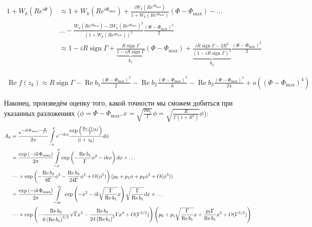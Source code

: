 \documentclass[a4paper, 12pt]{article}
\DeclareMathOperator*{\sign}{sign}
\DeclareMathOperator*{\Real}{Re}
\newenvironment{eqw}{\begin{equation} \begin{aligned}}   
    {\end{aligned}    \end{equation}}
\begin{document}
\begin{eqw}
     1+W_k(Re^{i\Phi}) &\approx 1+W_k(Re^{i\Phi_{\max}}) + 
     \frac{iW_k(Re^{i\Phi_{\max}})}{1+W_k(Re^{i\Phi_{\max}})}\left(\Phi - \Phi_{\max}\right) - \dots\\
     &\dots-\frac{W_k(Re^{i\Phi_{\max}}) - 2W_k(Re^{i\Phi_{\max}})^2}{\left(1+W_k(Re^{i\Phi_{\max}})\right)^3}\frac{\left(\Phi - \Phi_{\max}\right)^2}{2}\\
     &\approx 1- i R \sign \Gamma + \underbrace{\frac{R \sign \Gamma}{1-i R \sign \Gamma}}_{b_1}\left(\Phi - \Phi_{\max}\right) +
     \underbrace{\frac{i R \sign \Gamma - 2 R^2}{\left(1-i R \sign \Gamma\right)^3}}_{b_2}\frac{\left(\Phi - \Phi_{\max}\right)^2}{2}
\end{eqw}

\begin{eqw}
    \Real f(z_k) \approx R\sign\Gamma - \Real b_1 \frac{\left(\Phi - \Phi_{\max}\right)^2}{2} - \Real b_2 \frac{\left(\Phi - \Phi_{\max}\right)^3}{6} - \Real b_3 \frac{\left(\Phi - \Phi_{\max}\right)^4}{24}+o\left(\left(\Phi - \Phi_{\max}\right)^4\right)
\end{eqw}

Наконец, произведём оценку того, какой точности мы сможем добиться при указанных разложениях ($\phi = \Phi - \Phi_{\max}, x=\sqrt{\frac{{\Re b_1}}{{\Gamma}}}\phi = \sqrt{\frac{R}{\Gamma\left(1+R^2\right)}}\phi$):
\begin{eqw}
     A_k &= \frac{e^{-ik\Phi_{\max}-\frac{R}{\abs{\Gamma}}}}{2\pi}\int\limits_{-\pi}^\pi e^{-ik\phi} 
     \frac{\exp\left(\frac{\Real f(z_k)}{\Gamma}\right)}{\abs{i+z_k}}d\phi \\
    &=\frac{\exp\left(-ik\Phi_{\max}\right)}{2\pi}\int\limits_{-\pi}^\pi
    \exp\left(-\frac{\Real b_1}{\Gamma}\phi^2 -ik\phi \right)d\phi\times\dots\\
    &\dots\times\exp\left(-\frac{\Real b_2}{6\Gamma}\phi^3 - \frac{\Real b_3}{24\Gamma}\phi^4 + O(\phi^5)\right)(p_0 + p_1\phi + p_2\phi^2 + O(\phi^3)) \\
    &= \frac{\exp\left(-ik\Phi_{\max}\right)}{2\pi}\int\limits_{-\infty}^{\infty}\
    \exp\left(-x^2 - ik\sqrt{\frac{\Gamma}{\Real b_1}}x\right) \sqrt{\frac{\Gamma}{\Real b_1}} dx\times\dots\\
    &\dots\times \exp\left(-\frac{\Real b_2}{6\left(\Real b_1\right)^{3/2}}\sqrt{\Gamma}x^3 - \frac{\Real b_3}{24\left(\Real b_1\right)^{2}}\Gamma x^4 + O(\Gamma^{3/2})\right)
    \left(p_0 + p_1\sqrt{\frac{\Gamma}{\Real b_1}}x +\frac{p_2\Gamma}{\Real b_1}x^2 + O(\Gamma^{3/2})\right)
\end{eqw}
\end{document}
